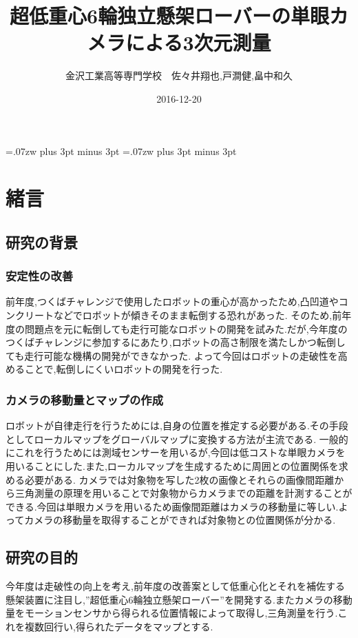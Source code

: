 \documentclass[twocolumn,11pt]{sotsuken_abst}
\title{超低重心6輪独立懸架ローバーの単眼カメラによる3次元測量}
\author{金沢工業高等専門学校　佐々井翔也,戸澗健,畠中和久}
\date{2016-12-20}
\begin{document}
\maketitle
\thispagestyle{fancy}
\pagestyle{fancy}

\setlength{\baselineskip}{5.6truemm}
\kanjiskip=.07zw plus 3pt minus 3pt
\xkanjiskip=.07zw plus 3pt minus 3pt

\section{緒言}
\subsection{研究の背景}

\subsubsection{安定性の改善}
前年度,つくばチャレンジで使用したロボットの重心が高かったため,凸凹道やコンクリートなどでロボットが傾きそのまま転倒する恐れがあった.
そのため,前年度の問題点を元に転倒しても走行可能なロボットの開発を試みた.だが,今年度のつくばチャレンジに参加するにあたり,ロボットの高さ制限を満たしかつ転倒しても走行可能な機構の開発ができなかった.
よって今回はロボットの走破性を高めることで,転倒しにくいロボットの開発を行った.
\subsubsection{カメラの移動量とマップの作成}
ロボットが自律走行を行うためには,自身の位置を推定する必要がある.その手段としてローカルマップをグローバルマップに変換する方法が主流である.
一般的にこれを行うためには測域センサーを用いるが,今回は低コストな単眼カメラを用いることにした.また,ローカルマップを生成するために周囲との位置関係を求める必要がある.
カメラでは対象物を写した2枚の画像とそれらの画像間距離から三角測量の原理を用いることで対象物からカメラまでの距離を計測することができる.今回は単眼カメラを用いるため画像間距離はカメラの移動量に等しい.よってカメラの移動量を取得することができれば対象物との位置関係が分かる.

\subsection{研究の目的}
今年度は走破性の向上を考え,前年度の改善案として低重心化とそれを補佐する懸架装置に注目し,”超低重心6輪独立懸架ローバー”を開発する.またカメラの移動量をモーションセンサから得られる位置情報によって取得し,三角測量を行う.これを複数回行い,得られたデータをマップとする.
\end{document}
